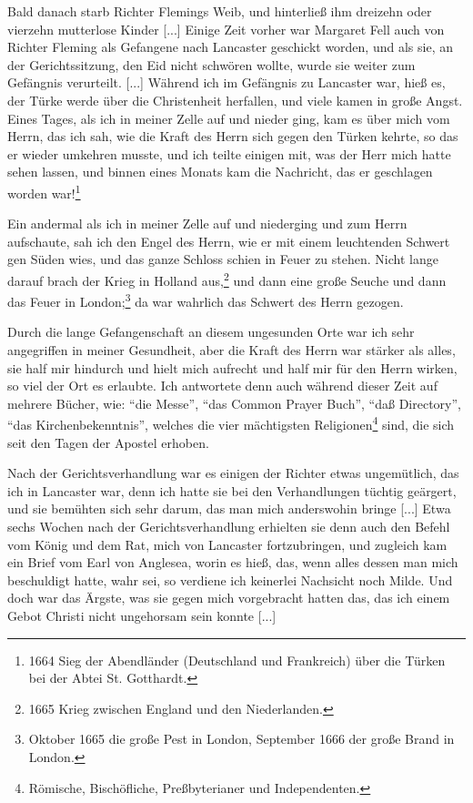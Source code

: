 Bald danach starb Richter Flemings Weib, und hinterließ
ihm dreizehn oder vierzehn mutterlose Kinder [...]
Einige Zeit vorher war Margaret Fell auch von Richter
Fleming als Gefangene nach Lancaster geschickt worden, und als
sie, an der Gerichtssitzung, den Eid nicht schwören wollte, wurde
sie weiter zum Gefängnis verurteilt. [...]
Während ich im Gefängnis zu Lancaster war, hieß es, der
Türke werde über die Christenheit herfallen, und viele kamen in
große Angst. Eines Tages, als ich in meiner Zelle auf und
nieder ging, kam es über mich vom Herrn, das ich sah, wie die
Kraft des Herrn sich gegen den Türken kehrte, so das er wieder
umkehren musste, und ich teilte einigen mit, was der Herr mich
hatte sehen lassen, und binnen eines Monats kam die Nachricht,
das er geschlagen worden war!\footnote{1664 Sieg der 
Abendländer (Deutschland und Frankreich) über die
Türken bei der Abtei St. Gotthardt.}

Ein andermal als ich in meiner Zelle auf und niederging
und zum Herrn aufschaute, sah ich den Engel des Herrn, wie er
mit einem leuchtenden Schwert gen Süden wies, und das ganze
Schloss schien in Feuer zu stehen. Nicht lange darauf brach der
Krieg in Holland aus,\footnote{1665 Krieg zwischen England 
und den Niederlanden.} und dann eine große Seuche und dann das
Feuer in London;\footnote{Oktober 1665 die große Pest in London, 
September 1666 der große Brand in London.} da war wahrlich 
das Schwert des Herrn gezogen.

Durch die lange Gefangenschaft an diesem ungesunden Orte
war ich sehr angegriffen in meiner Gesundheit, aber die Kraft
des Herrn war stärker als alles, sie half mir hindurch und hielt
mich aufrecht und half mir für den Herrn wirken, so viel der
Ort es erlaubte. Ich antwortete denn auch während dieser Zeit
auf mehrere Bücher, wie: "`die Messe"', "`das Common Prayer
Buch"', "`daß Directory"', "`das Kirchenbekenntnis"', welches die
vier mächtigsten Religionen\footnote{Römische, Bischöfliche, 
Preßbyterianer und Independenten.} sind, die sich seit den Tagen der
Apostel erhoben.

Nach der Gerichtsverhandlung war es einigen der Richter
etwas ungemütlich, das ich in Lancaster war, denn ich hatte sie
bei den Verhandlungen tüchtig geärgert, und sie bemühten sich
sehr darum, das man mich anderswohin bringe [...] Etwa sechs
Wochen nach der Gerichtsverhandlung erhielten sie denn auch den
Befehl vom König und dem Rat, mich von Lancaster fortzubringen,
und zugleich kam ein Brief vom Earl von 
Anglesea, worin es
hieß, das, wenn alles dessen man mich beschuldigt hatte, wahr
sei, so verdiene ich keinerlei Nachsicht noch Milde. Und doch war
das Ärgste, was sie gegen mich vorgebracht hatten das, das ich
einem Gebot Christi nicht ungehorsam sein konnte [...]

